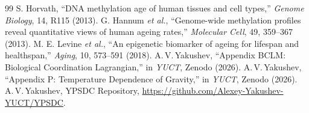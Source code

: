 \documentclass[12pt,a4paper]{article}
\begin{document}
	\begin{thebibliography}{99}
		 S. Horvath, ``DNA methylation age of human tissues and cell types,'' \emph{Genome Biology}, 14, R115 (2013).
		 G. Hannum \emph{et al.}, ``Genome-wide methylation profiles reveal quantitative views of human ageing rates,'' \emph{Molecular Cell}, 49, 359--367 (2013).
		 M. E. Levine \emph{et al.}, ``An epigenetic biomarker of ageing for lifespan and healthspan,'' \emph{Aging}, 10, 573--591 (2018).
		 A.\,V.\,Yakushev, ``Appendix BCLM: Biological Coordination Lagrangian,'' in \emph{YUCT}, Zenodo (2026).
		 A.\,V.\,Yakushev, ``Appendix P: Temperature Dependence of Gravity,'' in \emph{YUCT}, Zenodo (2026).
		 A.\,V.\,Yakushev, YPSDC Repository, \url{https://github.com/Alexey-Yakushev-YUCT/YPSDC}.
	\end{thebibliography}
	
\end{document}
